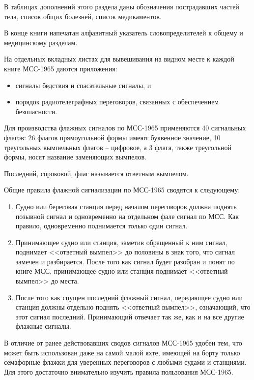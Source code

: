 \documentclass[a4paper, 12pt, twoside, final]{scrbook}
\begin{document}
        В таблицах дополнений этого раздела даны обозначения пострадавших частей тела, список общих болезней, список медикаментов.

        В конце книги напечатан алфавитный указатель словопределителей к общему и медицинскому разделам.

        На отдельных вкладных листах для вывешивания на видном месте к каждой книге МСС-1965 даются приложения:

\begin{itemize}
\item сигналы бедствия и спасательные сигналы, и
\item порядок радиотелеграфных переговоров, связанных с обеспечением безопасности.
\end{itemize}

        Для производства флажных сигналов по МСС-1965 применяются 40 сигнальных флагов: 26 флагов прямоугольной формы имеют буквенное значение, 10 треугольных вымпельных флагов \--- цифровое, а 3 флага, также треугольной формы, носят название заменяющих вымпелов.

        Последний, сороковой, флаг называется ответным вымпелом.

        Общие правила флажной сигнализации по МСС-1965 сводятся к следующему:

\begin{enumerate}
\item Судно или береговая станция перед началом переговоров должна поднять позывной сигнал и одновременно на отдельном фале сигнал по МСС. Как правило, одновременно поднимается только один сигнал.
\item Принимающее судно или станция, заметив обращенный к ним сигнал, поднимает <<ответный вымпел>> до половины в знак того, что сигнал замечен и разбирается. После того как сигнал будет разобран и понят по книге МСС, принимающее судно или станция поднимает <<ответный вымпел>> до места.
\item После того как спущен последний флажный сигнал, передающее судно или станция должны отдельно поднять <<ответный вымпел>>, означающий, что этот сигнал последний. Принимающий отвечает так же, как и на все другие флажные сигналы.
\end{enumerate}

        В отличие от ранее действовавших сводов сигналов МСС-1965 удобен тем, что может быть использован даже на самой малой яхте, имеющей на борту только семафорные флажки для уверенных переговоров с любыми судами и станциями. Для этого достаточно внимательно изучить правила пользования МСС-1965.
\end{document}
